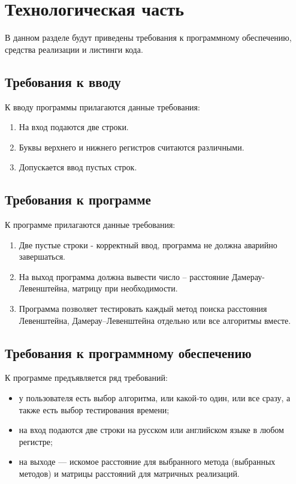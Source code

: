 \chapter{Технологическая часть}

В данном разделе будут приведены требования к программному обеспечению, средства реализации и листинги кода.

\section{Требования к вводу}
К вводу программы прилагаются данные требования:
\begin{enumerate}
	\item На вход подаются две строки.
	\item Буквы верхнего и нижнего регистров считаются различными.
	\item Допускается ввод пустых строк.
\end{enumerate}

\section{Требования к программе}
К программе прилагаются данные требования:
\begin{enumerate}
	\item Две пустые строки - корректный ввод, программа не должна аварийно завершаться.
	\item На выход программа должна вывести число -- расстояние Дамерау-Левенштейна, матрицу при необходимости.
	\item Программа позволяет тестировать каждый метод поиска расстояния Левенштейна, Дамерау--Левенштейна отдельно или все алгоритмы вместе.
\end{enumerate}

\section{Требования к программному обеспечению}

К программе предъявляется ряд требований:
\begin{itemize}
	\item у пользователя есть выбор алгоритма, или какой-то один, или все сразу, а также есть выбор тестирования времени;
	\item на вход подаются две строки на русском или английском языке в любом регистре;
	\item на выходе — искомое расстояние для выбранного метода (выбранных методов) и матрицы расстояний для матричных реализаций.
\end{itemize}

